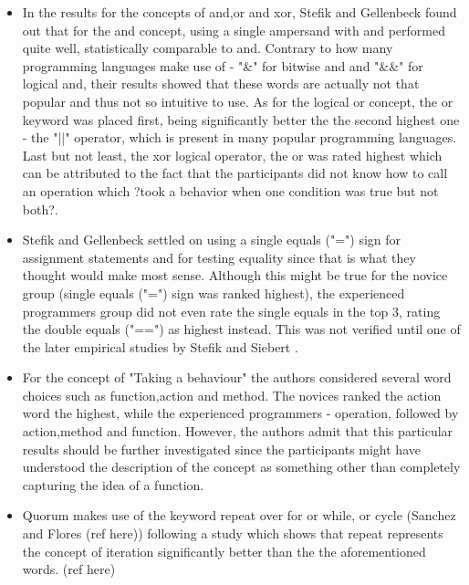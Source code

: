 \begin{itemize}
\item In the results for the concepts of and,or and xor, Stefik and Gellenbeck \cite{EmpStudiesonStimuli} found out that for the and concept,  using a single ampersand with and performed quite well, statistically comparable to and. Contrary to how many programming languages make use of - "\&" for bitwise and and "\&\&" for logical and, their results showed that these words are actually not that popular and thus not so intuitive to use. As for the logical or concept, the or keyword was placed first, being significantly better the the second highest one - the "||" operator, which is present in many popular programming languages. Last but not least, the xor logical operator, the or was rated highest which can be attributed to the fact that the participants did not know how to call an operation which ?took a behavior when one condition was true but not both?.
\item Stefik and Gellenbeck \cite{EmpStudiesonStimuli} settled on using a single equals ("=") sign for assignment statements and for testing equality since that is what they thought would make most sense. Although this might be true for the novice group (single equals ("=") sign was ranked highest), the experienced programmers group did not even rate the single equals in the top 3, rating the double equals ("==") as highest instead. This was not verified until one of the later empirical studies by Stefik and Siebert \cite{Empiricalinvestigation}.
\item For the concept of "Taking a behaviour" the authors considered several word choices such as function,action and method. The novices ranked the action word the highest, while the experienced programmers - operation, followed by action,method and function. However, the authors admit that this particular results should be further investigated since the participants might have understood the description of the concept as something other than completely capturing the idea of a function.
\item Quorum makes use of the keyword repeat over for or while, or cycle (Sanchez and Flores (ref here)) following a study which shows that repeat represents the concept of iteration significantly better than the the aforementioned words. (ref here)
\end{itemize}

